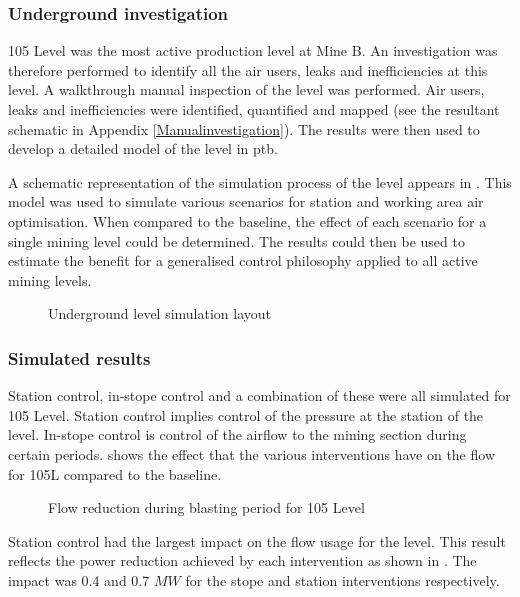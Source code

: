 	\subsubsection{Underground investigation}
	105 Level was the most active production level at Mine B. An investigation was therefore performed to identify all the air users, leaks and inefficiencies at this level. A walkthrough manual inspection of the level was performed. Air users, leaks and inefficiencies were identified, quantified and mapped (see the resultant schematic in Appendix \ref{Manualinvestigation}). The results were then used to develop a detailed model of the level in \gls{ptb}. 
	\par 
	A schematic representation of the simulation process of the level appears in . This model was used to simulate various scenarios for station and working area air optimisation. When compared to the baseline, the effect of each scenario for a single mining level could be determined. The results could then be used to estimate the benefit for a generalised control philosophy applied to all active mining levels.
	\begin{figure}[h!]
		\centering
		\caption{Underground level simulation layout}
		\label{fig: KUS Simulation level layout}
	\end{figure}	
	\clearpage
	\subsubsection{Simulated results}
	Station control, in-stope control and a combination of these were all simulated for 105 Level. Station control implies control of the pressure at the station of the level. In-stope control is control of the airflow to the mining section during certain periods.  shows the effect that the various interventions have on the flow for 105L compared to the baseline.

	\begin{figure}[h!]
		\centering
		
		\caption{Flow reduction during blasting period for 105 Level}
		\label{fig: 105 Flow savings}
	\end{figure}
Station control had the largest impact on the flow usage for the level. This result reflects the power reduction achieved by each intervention as shown in . The impact was 0.4 and 0.7 $MW$ for the stope and station interventions respectively.
	
